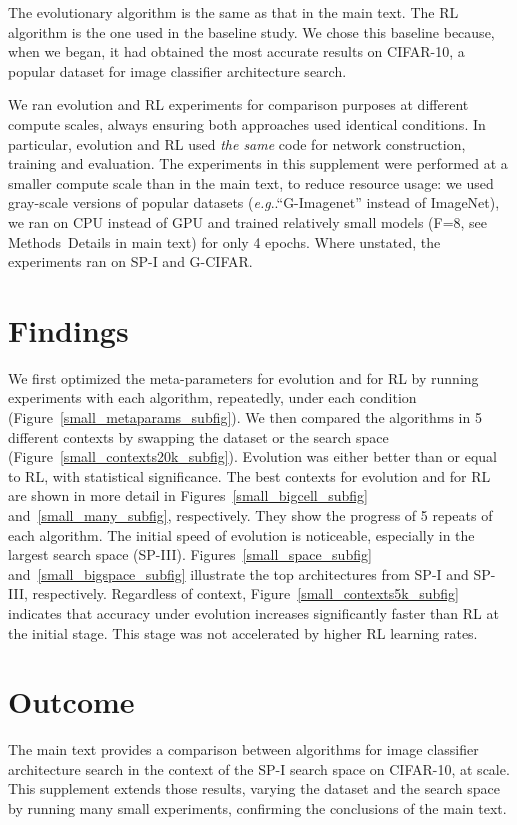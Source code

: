 \documentclass[letterpaper]{article} \usepackage{aaai19}  \usepackage{times}  \usepackage{helvet}  \usepackage{courier}  \usepackage{graphicx}  \frenchspacing
\makeatletter
\DeclareRobustCommand\onedot{\futurelet\@let@token\@onedot}
\def\@onedot{\ifx\@let@token.\else.\null\fi\xspace}
\def\eg{\emph{e.g}\onedot}
\makeatother
\begin{document}
The evolutionary algorithm is the same as that in the main text. The RL algorithm is the one used in the baseline study. We chose this baseline because, when we began, it had obtained the most accurate results on CIFAR-10, a popular dataset for image classifier architecture search.

We ran evolution and RL experiments for comparison purposes at different compute scales, always ensuring both approaches used identical conditions. In particular, evolution and RL used \textit{the same} code for network construction, training and evaluation. The experiments in this supplement were performed at a smaller compute scale than in the main text, to reduce resource usage: we used gray-scale versions of popular datasets (\eg ``G-Imagenet'' instead of ImageNet), we ran on CPU instead of GPU and trained relatively small models (F=8, see Methods~Details in main text) for only 4 epochs. Where unstated, the experiments ran on SP-I and G-CIFAR.


\section{Findings}


We first optimized the meta-parameters for evolution and for RL by running experiments with each algorithm, repeatedly, under each condition (Figure~\ref{small_metaparams_subfig}). We then compared the algorithms in 5 different contexts by swapping the dataset or the search space (Figure~\ref{small_contexts20k_subfig}). Evolution was either better than or equal to RL, with statistical significance. The best contexts for evolution and for RL are shown in more detail in Figures~\ref{small_bigcell_subfig} and~\ref{small_many_subfig}, respectively. They show the progress of 5 repeats of each algorithm. The initial speed of evolution is noticeable, especially in the largest search space (SP-III). Figures~\ref{small_space_subfig} and~\ref{small_bigspace_subfig} illustrate the top architectures from SP-I and SP-III, respectively. Regardless of context, Figure~\ref{small_contexts5k_subfig} indicates that accuracy under evolution increases significantly faster than RL at the initial stage. This stage was not accelerated by higher RL learning rates.


\section{Outcome}


The main text provides a comparison between algorithms for image classifier architecture search in the context of the SP-I search space on CIFAR-10, at scale. This supplement extends those results, varying the dataset and the search space by running many small experiments, confirming the conclusions of the main text.
\end{document}
